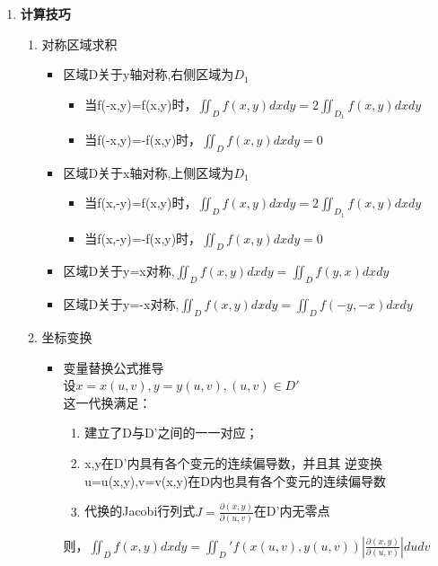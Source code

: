 \documentclass[12pt]{scrartcl}
\begin{document}
{\begin{enumerate}
    \item \textbf{计算技巧}\\
       \begin{enumerate}
           \item 对称区域求积
           \begin{itemize}
               \item 区域D关于y轴对称,右侧区域为$D_1$
               \begin{itemize}
                   \item 当f(-x,y)=f(x,y)时，$\iint _D f(x,y)dxdy=2\iint _{D_1} f(x,y)dxdy$
                   \item 当f(-x,y)=-f(x,y)时，$\iint _D f(x,y)dxdy=0$
               \end{itemize}
               \item 区域D关于x轴对称,上侧区域为$D_1$
               \begin{itemize}
                   \item 当f(x,-y)=f(x,y)时，$\iint _D f(x,y)dxdy=2\iint _{D_1} f(x,y)dxdy$
                   \item 当f(x,-y)=-f(x,y)时，$\iint _D f(x,y)dxdy=0$
               \end{itemize}
               \item 区域D关于y=x对称,$\iint _D f(x,y)dxdy=\iint _D f(y,x)dxdy$
               \item 区域D关于y=-x对称,$\iint _D f(x,y)dxdy=\iint _D f(-y,-x)dxdy$
           \end{itemize}
           \item 坐标变换
           \begin{itemize}
               \item 变量替换公式推导\\
               设$x=x(u,v),y=y(u,v),(u,v)\in D'$\\
               这一代换满足：
               \begin{enumerate}
                   \item 建立了D与D'之间的一一对应；
                   \item x,y在D'内具有各个变元的连续偏导数，并且其
                   逆变换u=u(x,y),v=v(x,y)在D内也具有各个变元的连续偏导数
                   \item 代换的Jacobi行列式$J=\frac{\partial(x,y)}{\partial(u,v)}$在D'内无零点
               \end{enumerate}
               则，$\iint_Df(x,y)dxdy=\iint _D'f(x(u,v),y(u,v))|\frac{\partial(x,y)}{\partial(u,v)}|dudv$ 

\end{itemize}
\end{enumerate}
\end{enumerate}}
\end{document}
